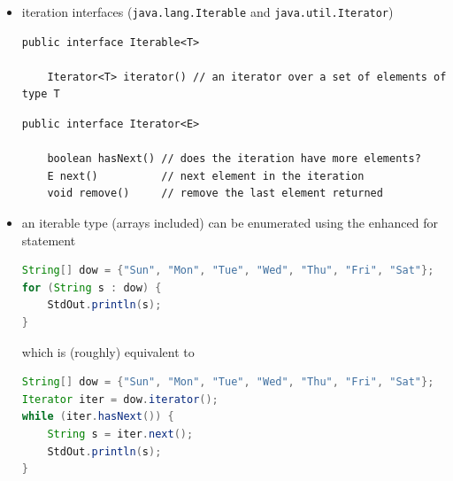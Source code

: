 \documentclass[8pt,a4paper,compress]{beamer}
\begin{document}
\begin{frame}[fragile]
\begin{itemize}
\item iteration interfaces (\lstinline{java.lang.Iterable} and \lstinline{java.util.Iterator})
\begin{lstlisting}[language={},mathescape]
public interface Iterable<T>

    Iterator<T> iterator() // an iterator over a set of elements of type T
\end{lstlisting}

\begin{lstlisting}[language={},mathescape]
public interface Iterator<E>

    boolean hasNext() // does the iteration have more elements?
    E next()          // next element in the iteration
    void remove()     // remove the last element returned
\end{lstlisting}

\item an iterable type (arrays included) can be enumerated using the enhanced for statement
\begin{lstlisting}[language=Java]
String[] dow = {"Sun", "Mon", "Tue", "Wed", "Thu", "Fri", "Sat"};
for (String s : dow) {
    StdOut.println(s);
}
\end{lstlisting}
which is (roughly) equivalent to
\begin{lstlisting}[language=Java]
String[] dow = {"Sun", "Mon", "Tue", "Wed", "Thu", "Fri", "Sat"};
Iterator iter = dow.iterator();
while (iter.hasNext()) {
    String s = iter.next();
    StdOut.println(s);
}
\end{lstlisting}
\end{itemize}
\end{frame}
\end{document}
